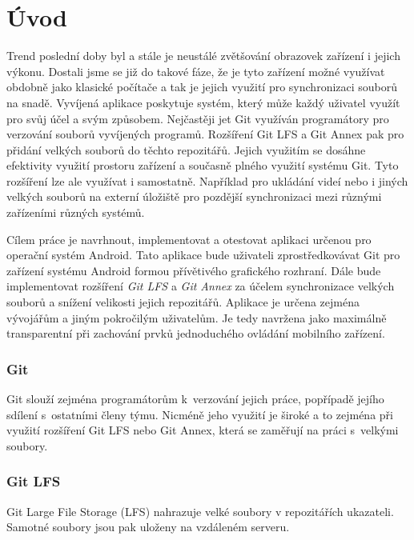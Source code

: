 \chapter{Úvod}
Trend poslední doby byl a stále je neustálé zvětšování obrazovek zařízení i jejich výkonu. Dostali jsme se již do takové fáze, že je tyto zařízení možné využívat obdobně jako klasické počítače a tak je jejich využití pro synchronizaci souborů na snadě.
Vyvíjená aplikace poskytuje systém, který může každý uživatel využít pro svůj účel a svým způsobem. Nejčastěji jet Git využíván programátory pro verzování souborů vyvíjených programů. Rozšíření Git LFS a Git Annex pak pro přidání velkých souborů do těchto repozitářů. Jejich využitím se dosáhne efektivity využití prostoru zařízení a současně plného využití systému Git. Tyto rozšíření lze ale využívat i samostatně. Například pro ukládání videí nebo i jiných velkých souborů na externí úložiště pro pozdější synchronizaci mezi různými zařízeními různých systémů.

Cílem práce je navrhnout, implementovat a otestovat aplikaci určenou pro operační systém Android. Tato aplikace bude uživateli zprostředkovávat Git pro zařízení systému Android formou přívětivého grafického rozhraní. Dále bude implementovat rozšíření \emph{Git LFS} a \emph{Git Annex} za účelem synchronizace velkých souborů a snížení velikosti jejich repozitářů. Aplikace je určena zejména vývojářům a jiným pokročilým uživatelům. Je tedy navržena jako maximálně transparentní při zachování prvků jednoduchého ovládání mobilního zařízení.

\subsection {Git}
Git slouží zejména programátorům k verzování jejich práce, popřípadě jejího sdílení s ostatními členy týmu. Nicméně jeho využití je široké a to zejména při využití rozšíření Git LFS nebo Git Annex, která se zaměřují na práci s velkými soubory.

\subsection{Git LFS}
Git Large File Storage (LFS) nahrazuje velké soubory v repozitářích ukazateli. Samotné soubory jsou pak uloženy na vzdáleném serveru.

